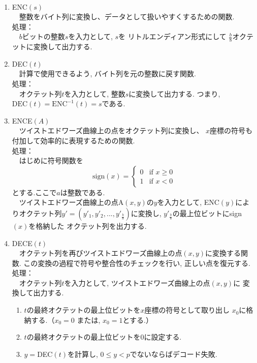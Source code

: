\\
\begin{enumerate}
  \item ENC$(s)$\\
  　整数をバイト列に変換し、データとして扱いやすくするための関数.\\
  処理：\\
  　$b$ビットの整数$s$を入力として, $s$を リトルエンディアン形式にして
  $\tfrac{b}{8}$オクテットに変換して出力する.
  \item DEC$(t)$\\
  　計算で使用できるよう, バイト列を元の整数に戻す関数.\\
  処理：\\
  　オクテット列$t$を入力として, 整数$s$に変換して出力する.
  つまり, $\mathrm{DEC}(t)=\mathrm{ENC}^{-1}(t)=s$である.
  \item ENCE$(A)$\\
  　ツイストエドワーズ曲線上の点をオクテット列に変換し、
  $x$座標の符号も付加して効率的に表現するための関数.\\
  処理：\\
  　はじめに符号関数を
  \[
    \text{sign}(x) =
    \begin{cases}
    0 & \text{if } x \geq 0 \\
    1 & \text{if } x < 0
    \end{cases}
  \]
  とする.ここで$a$は整数である.\\
  　ツイストエドワーズ曲線上の点A$(x,y)$の$y$を入力として, 
  ENC$(y)$によりオクテット列$y'=(y'_1,y'_2,...,y'_\frac{b}{8})$に変換し, 
  $y'_\frac{b}{8}$の最上位ビットにsign$(x)$を格納した
  オクテット列を出力する.
  \item DECE$(t)$\\
  　オクテット列を再びツイストエドワーズ曲線上の点$(x, y)$に変換する関数.
  この変換の過程で符号や整合性のチェックを行い, 正しい点を復元する.\\
  処理：\\
  　オクテット列$t$を入力として, ツイストエドワーズ曲線上の点$(x,y)$に
  変換して出力する.
  \begin{enumerate}
    \item $t$の最終オクテットの最上位ビットを$x$座標の符号として取り出し
    $x_0$に格納する.（$x_0=0$ または, $x_0=1$とする.）
    \item $t$の最終オクテットの最上位ビットを0に設定する.
    \item $y=$DEC$(t)$を計算し, $0\leq y<p$でないならばデコード失敗.

\end{enumerate}
\end{enumerate}
